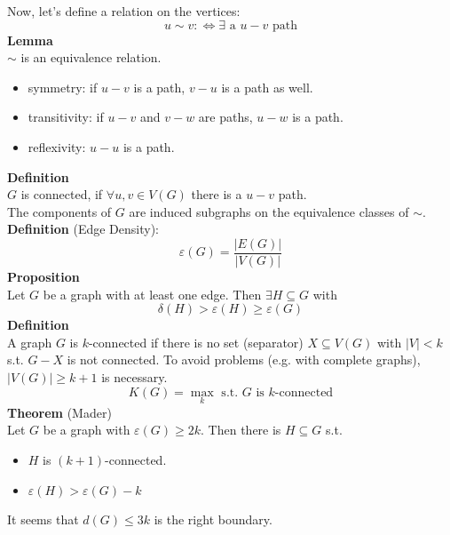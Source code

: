 \documentclass[a4paper, 12pt]{article}
\begin{document}
	Now, let's define a relation on the vertices: \[u\sim v :\Leftrightarrow \exists \text{ a $u-v$ path}\]
	\textbf{Lemma}\\
	$\sim$ is an equivalence relation.
	\begin{itemize}
		\item symmetry: if $u-v$ is a path, $v-u$ is a path as well.
		\item transitivity: if $u-v$ and $v-w$ are paths, $u-w$ is a path.
		\item reflexivity: $u-u$ is a path.
	\end{itemize}
	\textbf{Definition}\\
	$G$ is connected, if $\forall u,v \in V(G)$ there is a $u-v$ path.\\
	The components of $G$ are induced subgraphs on the equivalence classes of $\sim$.\\
	\textbf{Definition} (Edge Density):
	\[\varepsilon(G) = \frac{\left|E(G)\right|}{\left|V(G)\right|}\]
	\textbf{Proposition}\\
	Let $G$ be a graph with at least one edge. Then $\exists H \subseteq G$ with \[\delta(H) > \varepsilon(H) \geq \varepsilon(G)\]
	\textbf{Definition}\\
	A graph $G$ is $k$-connected if there is no set (separator) $X\subseteq V(G)$ with $\left|V\right|<k$ s.t. $G-X$ is not connected. To avoid problems (e.g. with complete graphs), $\left|V(G)\right|\geq k+1$ is necessary.
	\[K(G) = \max_k \text{ s.t. $G$ is $k$-connected}\]
	\textbf{Theorem} (Mader)\\
	Let $G$ be a graph with $\varepsilon(G) \geq 2k$. Then there is $H \subseteq G$ s.t. \begin{itemize}
		\item $H$ is $(k+1)$-connected.
		\item $\varepsilon(H) > \varepsilon(G)-k$
	\end{itemize} 
	It seems that $d(G) \leq 3k$ is the right boundary.\\
	
\end{document}
